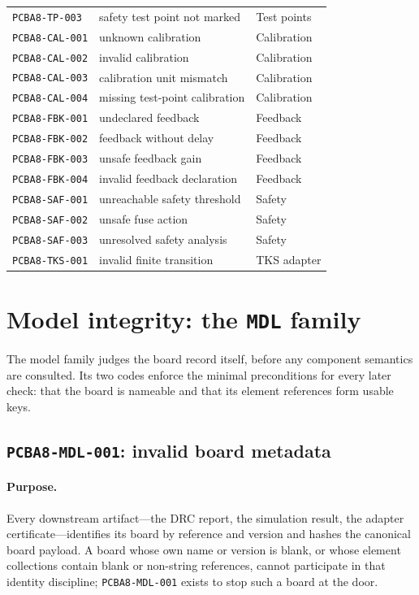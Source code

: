 \begin{center}
\begin{longtable}{@{}lll@{}}
\texttt{PCBA8-TP-003} & safety test point not marked & Test points \\
\texttt{PCBA8-CAL-001} & unknown calibration & Calibration \\
\texttt{PCBA8-CAL-002} & invalid calibration & Calibration \\
\texttt{PCBA8-CAL-003} & calibration unit mismatch & Calibration \\
\texttt{PCBA8-CAL-004} & missing test-point calibration & Calibration \\
\texttt{PCBA8-FBK-001} & undeclared feedback & Feedback \\
\texttt{PCBA8-FBK-002} & feedback without delay & Feedback \\
\texttt{PCBA8-FBK-003} & unsafe feedback gain & Feedback \\
\texttt{PCBA8-FBK-004} & invalid feedback declaration & Feedback \\
\texttt{PCBA8-SAF-001} & unreachable safety threshold & Safety \\
\texttt{PCBA8-SAF-002} & unsafe fuse action & Safety \\
\texttt{PCBA8-SAF-003} & unresolved safety analysis & Safety \\
\texttt{PCBA8-TKS-001} & invalid finite transition & TKS adapter \\
\end{longtable}
\end{center}

\section{Model integrity: the \texttt{MDL} family}\label{ch07:sec:mdl}

The model family judges the board record itself, before any component semantics are consulted. Its two codes enforce the minimal preconditions for every later check: that the board is nameable and that its element references form usable keys.

\subsection{\texttt{PCBA8-MDL-001}: invalid board metadata}\label{ch07:sub:mdl001}

\paragraph{Purpose.} Every downstream artifact---the DRC report, the simulation result, the adapter certificate---identifies its board by reference and version and hashes the canonical board payload. A board whose own name or version is blank, or whose element collections contain blank or non-string references, cannot participate in that identity discipline; \texttt{PCBA8-MDL-001} exists to stop such a board at the door.

